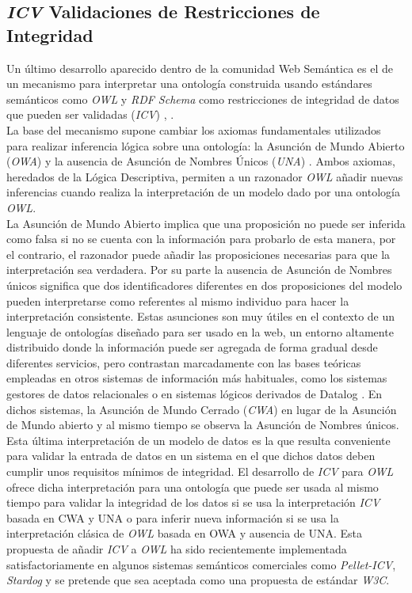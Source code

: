 \subsection{\textit{ICV} Validaciones de Restricciones de Integridad}

Un \'ultimo desarrollo aparecido dentro de la comunidad Web Sem\'antica es el de un mecanismo para interpretar una ontolog\'ia construida usando est\'andares sem\'anticos como \textit{OWL} y \textit{RDF Schema} como restricciones de integridad de datos que pueden ser validadas (\textit{ICV}) \cite{tao2010integrity}, \cite{motik2009bridging}.\\
La base del mecanismo supone cambiar los axiomas fundamentales utilizados para realizar inferencia l\'ogica sobre una ontolog\'ia: la Asunci\'on de Mundo Abierto (\textit{OWA}) y la ausencia de Asunci\'on de Nombres \'Unicos (\textit{UNA}) \cite{sirin2008opening}. Ambos axiomas, heredados de la L\'ogica Descriptiva, permiten a un razonador \textit{OWL} a\~nadir nuevas inferencias cuando realiza la interpretaci\'on de un modelo dado por una ontolog\'ia \textit{OWL}.\\
La Asunci\'on de Mundo Abierto implica que una proposici\'on no puede ser inferida como falsa si no se cuenta con la informaci\'on para probarlo de esta manera, por el contrario, el razonador puede a\~nadir las proposiciones necesarias para que la interpretaci\'on sea verdadera. Por su parte la ausencia de Asunci\'on de Nombres \'unicos significa que dos identificadores diferentes en dos proposiciones del modelo pueden interpretarse como referentes al mismo individuo para hacer la interpretaci\'on consistente. Estas asunciones son muy \'utiles en el contexto de un lenguaje de ontolog\'ias dise\~nado para ser usado en la web, un entorno altamente distribuido donde la informaci\'on puede ser agregada de forma gradual desde diferentes servicios, pero contrastan marcadamente con las bases te\'oricas empleadas en otros sistemas de informaci\'on m\'as habituales, como los sistemas gestores de datos relacionales o en sistemas l\'ogicos derivados de Datalog \cite{motik2006can}. En dichos sistemas, la Asunci\'on de Mundo Cerrado (\textit{CWA}) en lugar de la Asunci\'on de Mundo abierto y al mismo tiempo se observa la Asunci\'on de Nombres \'unicos.\\
Esta \'ultima interpretaci\'on de un modelo de datos es la que resulta conveniente para validar la entrada de datos en un sistema en el que dichos datos deben cumplir unos requisitos m\'inimos de integridad. El desarrollo de \textit{ICV} para \textit{OWL} ofrece dicha interpretaci\'on para una ontolog\'ia que puede ser usada al mismo tiempo para validar la integridad de los datos si se usa la interpretaci\'on \textit{ICV} basada en CWA y UNA o para inferir nueva informaci\'on si se usa la interpretaci\'on cl\'asica de \textit{OWL} basada en OWA y ausencia de UNA.
Esta propuesta de a\~nadir \textit{ICV} a \textit{OWL} ha sido recientemente implementada satisfactoriamente en algunos sistemas sem\'anticos comerciales como \textit{Pellet-ICV}, \textit{Stardog} y se pretende que sea aceptada como una propuesta de est\'andar \textit{W3C}.

